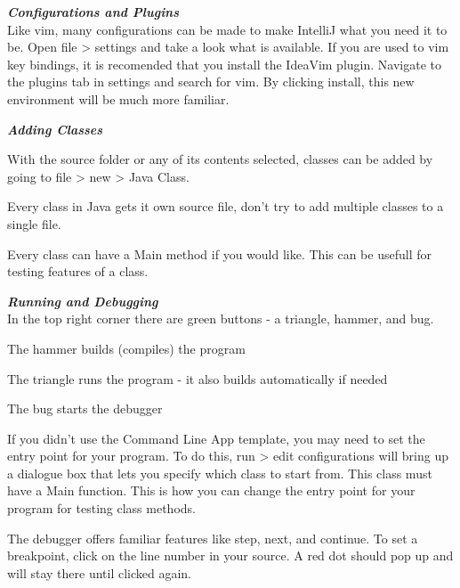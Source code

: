 \documentclass[../../main.tex]{subfiles}
\begin{document}
\emph{\bfseries Configurations and Plugins}\\
Like vim, many configurations can be made to make IntelliJ what you need it to be. Open file > settings and take a look what is available.
If you are used to vim key bindings, it is recomended that you install the IdeaVim plugin. Navigate to the plugins tab in settings and search
for vim. By clicking install, this new environment will be much more familiar.

\emph{\bfseries Adding Classes}\\
\begin{steps}
   \item With the source folder or any of its contents selected, classes can be added by going to file > new > Java Class.
   \item Every class in Java gets it own source file, don't try to add multiple classes to a single file.
   \item Every class can have a Main method if you would like. This can be usefull for testing features of a class.
\end{steps}

\emph{\bfseries Running and Debugging}\\
In the top right corner there are green buttons - a triangle, hammer, and bug.
\begin{steps}
   \item The hammer builds (compiles) the program
   \item The triangle runs the program - it also builds automatically if needed
   \item The bug starts the debugger
   \item If you didn't use the Command Line App template, you may need to set the entry point for your program. To do this, run > edit
      configurations will bring up a dialogue box that lets you specify which class to start from. This class must have a Main function.
      This is how you can change the entry point for your program for testing class methods.
   \item The debugger offers familiar features like step, next, and continue. To set a breakpoint, click on the line number in your source.
      A red dot should pop up and will stay there until clicked again.
\end{steps}
\end{document}

